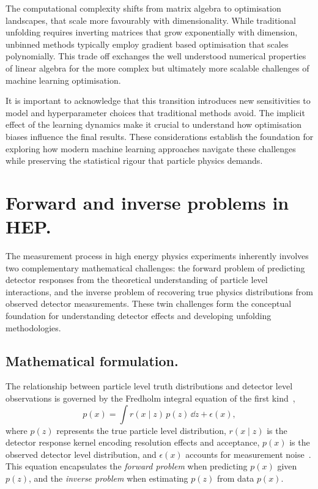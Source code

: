         The computational complexity shifts from matrix algebra to optimisation landscapes, that scale more favourably with dimensionality.
        While traditional unfolding requires inverting matrices that grow exponentially with dimension, unbinned methods typically employ gradient based optimisation that scales polynomially.
        This trade off exchanges the well understood numerical properties of linear algebra for the more complex but ultimately more scalable challenges of machine learning optimisation.

        It is important to acknowledge that this transition introduces new sensitivities to model and hyperparameter choices that traditional methods avoid.
        The implicit effect of the learning dynamics make it crucial to understand how optimisation biases influence the final results.
        These considerations establish the foundation for exploring how modern machine learning approaches navigate these challenges while preserving the statistical rigour that particle physics demands.

\section{Forward and inverse problems in HEP.}
    The measurement process in high energy physics experiments inherently involves two complementary mathematical challenges: the forward problem of predicting detector responses from the theoretical understanding of particle level interactions, and the inverse problem of recovering true physics distributions from observed detector measurements.
    These twin challenges form the conceptual foundation for understanding detector effects and developing unfolding methodologies.

\subsection{Mathematical formulation.}

The relationship between particle level truth distributions and detector level observations is governed by the Fredholm integral equation of the first kind~\cite{fredholm_sur_1903},
%
\begin{equation}
    p(x) = \int r(x\mid z)\,p(z) \, \dd z + \epsilon(x),
\end{equation}
where \(p(z)\) represents the true particle level distribution, \(r(x\mid z)\) is the detector response kernel encoding resolution effects and acceptance, \(p(x)\) is the observed detector level distribution, and \(\epsilon(x)\) accounts for measurement noise~\cite{weinberg_elementary_1963}.
%
This equation encapsulates the \emph{forward problem} when predicting \(p(x)\) given \(p(z)\), and the \textit{inverse problem} when estimating \(p(z)\) from data \(p(x)\).

